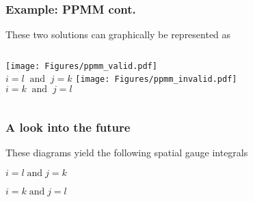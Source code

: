 \documentclass[10pt,a4paper,usenames,dvipsnames]{beamer}
\begin{document}
\begin{frame}
  \frametitle{Example: PPMM cont.}

  These two solutions can graphically be represented as

  \vfill

    \begin{columns}[onlytextwidth]
      \centering
      \texttt{[image: Figures/ppmm\_valid.pdf]} \\
      $i = l \;\; \text{and} \;\; j = k$
      \centering
      \texttt{[image: Figures/ppmm\_invalid.pdf]} \\
      $i = k \;\; \text{and} \;\; j = l$
    \end{columns}
\end{frame}

\begin{frame}
  \frametitle{A look into the future}

  These diagrams yield the following spatial gauge integrals

  \vspace{1em}

  \begin{exampleblock}{$i = l \; \text{and} \; j = k$}
    \centering
  \end{exampleblock}

  \vspace{1em}

  \begin{exampleblock}{$i = k \; \text{and} \; j = l$}
    \centering
  \end{exampleblock}

\end{frame}
\end{document}
